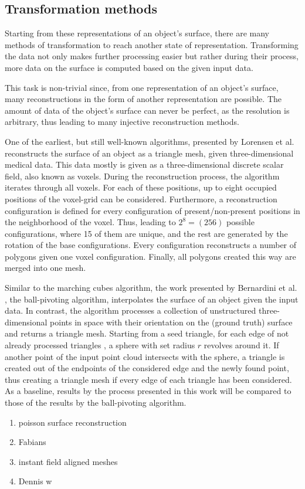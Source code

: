 \subsection{Transformation methods}
Starting from these representations of an object's surface, there are many methods 
of transformation to reach another state of representation. 
Transforming the data not only makes further processing easier
 but rather during their process, more data on the surface is 
 computed based on the given input data.

 This task is non-trivial since, from one representation of an object's surface, many reconstructions in the form of another representation are possible. The amount of data of the object's surface can never be perfect, as the resolution is arbitrary, thus leading to many injective reconstruction methods.

One of the earliest, but still well-known algorithms, presented by
 Lorensen et al. \cite{Lorensen:1987:MCH:37402.37422} reconstructs the surface of an object as a
  triangle mesh, given three-dimensional medical data. This data mostly is given as
   a three-dimensional discrete scalar field, also known as voxels. 
During the reconstruction process, the algorithm iterates through all voxels. For each of these positions, up to eight occupied positions of the voxel-grid can be considered. Furthermore, a reconstruction configuration is defined for every configuration of present/non-present positions in the neighborhood of the voxel. Thus, leading to $2^8 = (256)$ possible configurations, where 15 of them are unique, and the rest are generated by the rotation of the base configurations.  Every configuration reconstructs a number of polygons given one voxel configuration. Finally, all polygons created this way are merged into one mesh.

Similar to the marching cubes algorithm, the work presented by 
Bernardini et al. \cite{817351}, the ball-pivoting algorithm, 
interpolates the surface of an object given the input data.
In contrast, the algorithm processes a collection of unstructured 
three-dimensional points in space with their orientation on the
(ground truth) surface and returns a triangle mesh. Starting from
 a seed triangle, for each edge of not already processed triangles
 , a sphere with set radius $r$ revolves around it. If another point
  of the input point cloud intersects with the sphere, a triangle is 
  created out of the endpoints of the considered edge and the newly 
  found point, thus creating a triangle mesh if every edge of each 
  triangle has been considered. 
  As a baseline, results by the process presented in this work
  will be compared to those of the results by the ball-pivoting algorithm.
\begin{enumerate}
  \item poisson surface reconstruction
  \item Fabians \cite{Groh2017}
  \item instant field aligned meshes
  \item Dennis w\cite{bukenberger2018hierarchical}
\end{enumerate}


